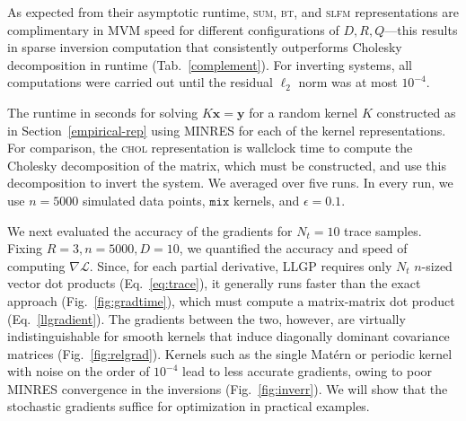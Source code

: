 \documentclass{article}
\def \mcL {\mathcal{L}}
\def\Tx{\textbf{x}}
\def\Ty{\textbf{y}}
\begin{document}
As expected from their asymptotic runtime, \textsc{sum}, \textsc{bt}, and \textsc{slfm} representations are complimentary in MVM speed for different configurations of $D,R,Q$---this results in sparse inversion computation that consistently outperforms Cholesky decomposition in runtime (Tab.~\ref{complement}).
For inverting systems, all computations were carried out until the residual $\ell_2$ norm was at most $10^{-4}$.
\begin{table}[!ht]
  \caption{The runtime in seconds for solving $K\Tx=\Ty$ for a random kernel $K$ constructed as in Section~\ref{empirical-rep} using MINRES for each of the kernel representations. For comparison, the \textsc{chol} representation is wallclock time to compute the Cholesky decomposition of the matrix, which must be constructed, and use this decomposition to invert the system. We averaged over five runs. In every run, we use $n=5000$ simulated data points, $\texttt{mix}$ kernels, and $\epsilon=0.1$.
}
\label{complement}
\vskip 0.15in
\begin{center}
  \begin{small}
    
\end{small}
\end{center}
\vskip -0.1in
\end{table}

We next evaluated the accuracy of the gradients for $N_t=10$ trace samples. Fixing $R=3,n=5000,D=10$, we quantified the accuracy and speed of computing $\nabla\mcL$. Since, for each partial derivative, LLGP requires only $N_t$ $n$-sized vector dot products (Eq.~\ref{eq:trace}), it generally runs faster than the exact approach (Fig.~\ref{fig:gradtime}), which must compute a matrix-matrix dot product (Eq.~\ref{llgradient}). The gradients between the two, however, are virtually indistinguishable for smooth kernels that induce diagonally dominant covariance matrices (Fig.~\ref{fig:relgrad}). Kernels such as the single Mat\'{e}rn or periodic kernel with noise on the order of $10^{-4}$ lead to less accurate gradients, owing to poor MINRES convergence in the inversions (Fig.~\ref{fig:inverr}). We will show that the stochastic gradients suffice for optimization in practical examples.
\end{document}

